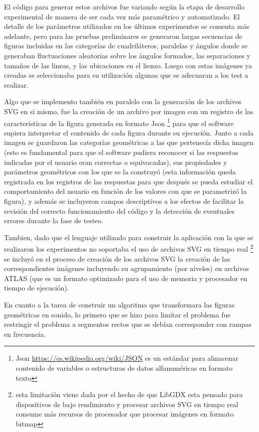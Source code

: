 \documentclass{article}
\numberwithin{figure}{section}
\begin{document}
    El código para generar estos archivos fue variando según la etapa de desarrollo experimental de manera de ser cada vez más paramétrico y automatizado. El detalle de los parámetros utilizados en los últimos experimentos se comenta más adelante, pero para las pruebas preliminares se generaron largas secuencias de figuras incluidas en las categorías de cuadriláteros, paralelas y ángulos donde se generaban fluctuaciones aleatorias sobre los ángulos formados, las separaciones y tamaños de las lineas, y las ubicaciones en el lienzo. Luego con estas imágenes ya creadas se seleccionaba para su utilización algunas que se adecuaran a los test a realizar.
    
    Algo que se implemento también en paralelo con la generación de los archivos SVG en si mismo, fue la creación de un archivo por imagen con un registro de las características de la figura generada en formato Json \footnote{Json \url{https://es.wikipedia.org/wiki/JSON} es un estándar para almacenar contenido de variables o estructuras de datos alfanuméricas en formato texto} para que el software supiera interpretar el contenido de cada figura durante su ejecución. Junto a cada imagen se guardaron las categorías geométricas a las que pertenecía dicha imagen (esto es fundamental para que el software pudiera reconocer si las respuestas indicadas por el usuario eran correctas o equivocadas), sus propiedades y parámetros geométricos con los que se la construyó (esta información queda registrada en los registros de las respuestas para que después se pueda estudiar el comportamiento del usuario en función de los valores con que se parametrizó la figura), y además se incluyeron campos descriptivos a los efectos de facilitar la revisión del correcto funcionamiento del código y la detección de eventuales errores durante la fase de testeo. 
    
    Tambien, dado que el lenguaje utilizado para construir la aplicación con la que se realizaron los experimentos no soportaba el uso de archivos SVG en tiempo real \footnote{esta limitación viene dada por el hecho de que LibGDX esta pensado para dispositivos de bajo rendimiento y procesar archivos SVG en tiempo real consume más recursos de procesador que procesar imágenes en formato bitmap} se incluyó en el proceso de creación de los archivos SVG la creación de las correspondientes imágenes incluyendo su agrupamiento (por niveles) en archivos ATLAS (que es un formato optimizado para el uso de memoria y procesador en tiempo de ejecución).
    
    En cuanto a la tarea de construir un algoritmo que transformara las figuras geométricas en sonido, lo primero que se hizo para limitar el problema fue restringir el problema a segmentos rectos que se debían corresponder con rampas en frecuencia.
    
\end{document}

